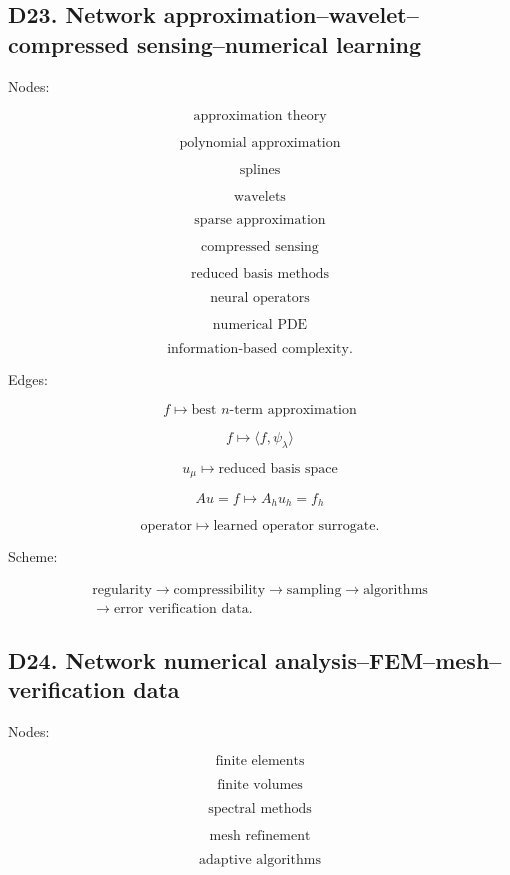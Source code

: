 \documentclass[11pt]{article}
\begin{document}
\subsection{D23. Network approximation--wavelet--compressed sensing--numerical learning}

Nodes:

\[
\text{approximation theory}
\]

\[
\text{polynomial approximation}
\]

\[
\text{splines}
\]

\[
\text{wavelets}
\]

\[
\text{sparse approximation}
\]

\[
\text{compressed sensing}
\]

\[
\text{reduced basis methods}
\]

\[
\text{neural operators}
\]

\[
\text{numerical PDE}
\]

\[
\text{information-based complexity}.
\]

Edges:

\[
f\mapsto \text{best }n\text{-term approximation}
\]

\[
f\mapsto {\langle f,\psi_\lambda\rangle}
\]

\[
u_\mu\mapsto \text{reduced basis space}
\]

\[
Au=f\mapsto A_hu_h=f_h
\]

\[
\text{operator}\mapsto \text{learned operator surrogate}.
\]

Scheme:

\[
\begin{gathered}
\text{regularity} \to \text{compressibility} \to \text{sampling} \to \text{algorithms} \\
\to \text{error verification data}.
\end{gathered}
\]



\subsection{D24. Network numerical analysis--FEM--mesh--verification data}

Nodes:

\[
\text{finite elements}
\]

\[
\text{finite volumes}
\]

\[
\text{spectral methods}
\]

\[
\text{mesh refinement}
\]

\[
\text{adaptive algorithms}
\]
\end{document}
